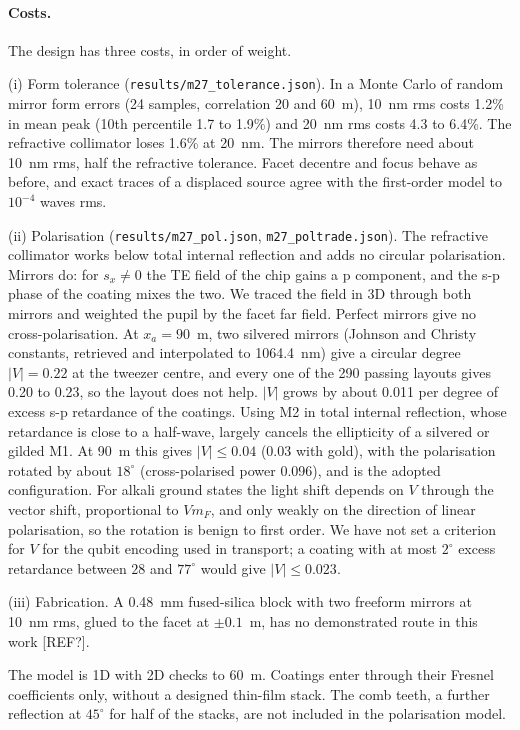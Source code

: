 \paragraph{Costs.} The design has three costs, in order of weight.

(i) Form tolerance (\texttt{results/\allowbreak m27\_tolerance.json}). In a Monte Carlo of random mirror form errors (24 samples, correlation 20 and 60~\textmu m), 10~nm rms costs 1.2\% in mean peak (10th percentile 1.7 to 1.9\%) and 20~nm rms costs 4.3 to 6.4\%. The refractive collimator loses 1.6\% at 20~nm. The mirrors therefore need about 10~nm rms, half the refractive tolerance. Facet decentre and focus behave as before, and exact traces of a displaced source agree with the first-order model to $10^{-4}$ waves rms.

(ii) Polarisation (\texttt{results/\allowbreak m27\_pol.json}, \texttt{m27\_poltrade.json}). The refractive collimator works below total internal reflection and adds no circular polarisation. Mirrors do: for $s_x\neq0$ the TE field of the chip gains a p component, and the s-p phase of the coating mixes the two. We traced the field in 3D through both mirrors and weighted the pupil by the facet far field. Perfect mirrors give no cross-polarisation. At $x_a=90$~\textmu m, two silvered mirrors (Johnson and Christy constants, retrieved and interpolated to 1064.4~nm) give a circular degree $|V|=0.22$ at the tweezer centre, and every one of the 290 passing layouts gives 0.20 to 0.23, so the layout does not help. $|V|$ grows by about 0.011 per degree of excess s-p retardance of the coatings. Using M2 in total internal reflection, whose retardance is close to a half-wave, largely cancels the ellipticity of a silvered or gilded M1. At 90~\textmu m this gives $|V|\leq0.04$ (0.03 with gold), with the polarisation rotated by about $18^\circ$ (cross-polarised power 0.096), and is the adopted configuration. For alkali ground states the light shift depends on $V$ through the vector shift, proportional to $Vm_F$, and only weakly on the direction of linear polarisation, so the rotation is benign to first order. We have not set a criterion for $V$ for the qubit encoding used in transport; a coating with at most $2^\circ$ excess retardance between $28$ and $77^\circ$ would give $|V|\leq0.023$.

(iii) Fabrication. A 0.48~mm fused-silica block with two freeform mirrors at 10~nm rms, glued to the facet at $\pm0.1$~\textmu m, has no demonstrated route in this work [REF?].

The model is 1D with 2D checks to 60~\textmu m. Coatings enter through their Fresnel coefficients only, without a designed thin-film stack. The comb teeth, a further reflection at $45^\circ$ for half of the stacks, are not included in the polarisation model.


